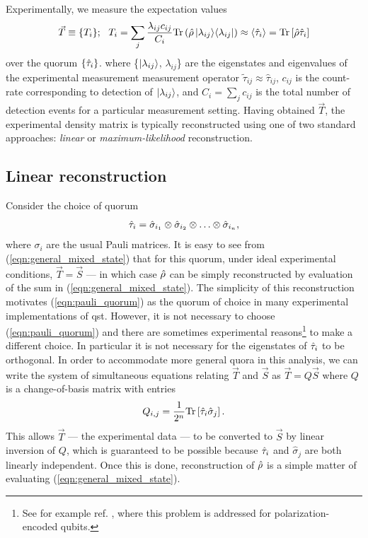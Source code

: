 Experimentally, we measure the expectation values 
\begin{equation}
    \vec{T} \equiv \{T_i\}; ~~ T_i = \sum_j 
    \frac{\lambda_{ij} c_{ij}}{C_i}
    \mathrm{Tr} \left( \hat{\rho}\, \mbox{$ | \lambda_{ij} \rangle $}\mbox{$ \langle \lambda_{ij} | $} \right)
    \approx \langle \hat{\tau}_i \rangle = \mathrm{Tr}\left[ \hat{\rho} \hat{\tau}_i \right]
\end{equation}
over the quorum $\{\hat{\tau}_i\}$. where \{$\mbox{$ | \lambda_{ij} \rangle $}$, $\lambda_{ij}$\} are the eigenstates and eigenvalues of the experimental measurement measurement operator $\tilde{\tau}_{ij} \approx \hat{\tau}_{ij}$, $c_{ij}$ is the count-rate corresponding to detection of $\mbox{$ | \lambda_{ij} \rangle $}$, and $C_i=\sum_{j} c_{ij}$ is the total number of detection events for a particular measurement setting.
Having obtained $\vec{T}$, the experimental density matrix is typically reconstructed using one of two standard approaches: \emph{linear} or \emph{maximum-likelihood} reconstruction.

\subsection{Linear reconstruction}
Consider the choice of quorum 
\begin{equation}
\hat{\tau}_i = \hat{\sigma}_{i_1} \otimes \hat{\sigma}_{i_2} \otimes \ldots \otimes \hat{\sigma}_{i_n},
\label{eqn:pauli_quorum}
\end{equation}
where $\sigma_i$ are the usual Pauli matrices.
It is easy to see 
from (\ref{eqn:general_mixed_state}) that for this quorum, under ideal experimental conditions, $\vec{T} = \vec{S}$ --- in which case $\hat{\rho}$ can be simply reconstructed by evaluation of the sum in (\ref{eqn:general_mixed_state}). The simplicity of this reconstruction motivates (\ref{eqn:pauli_quorum}) as the quorum of choice in many experimental implementations of \gls{qst}. However, it is not necessary to choose (\ref{eqn:pauli_quorum}) and there are sometimes experimental reasons\footnote{See for example ref. \cite{LangfordThesis}, where this problem is addressed for polarization-encoded qubits.}
to make a different choice. In particular it is not necessary for the eigenstates of $\hat{\tau}_i$ to be orthogonal. In order to accommodate more general quora in this analysis, we can write the system of simultaneous equations relating $\vec{T}$ and $\vec{S}$ as $\vec{T} = Q \vec{S}$
where $Q$ is a change-of-basis matrix with entries
\begin{equation}
    Q_{i,j}=\frac{1}{2^n} \mathrm{Tr} \left[ \hat{\tau}_i \hat{\sigma}_j \right].
\end{equation}
This allows $\vec{T}$ --- the experimental data --- to be converted to $\vec{S}$ by linear inversion of $Q$, which is guaranteed to be possible because $\hat{\tau}_i$ and $\hat{\sigma}_j$ are both linearly independent. Once this is done, reconstruction of $\hat{\rho}$ is a simple matter of evaluating (\ref{eqn:general_mixed_state}).


